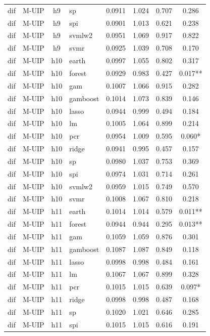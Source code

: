 \begin{ThreePartTable}
\begin{longtable}[t]{llclcccc}
dif & M-UIP & h9 & sp & 0.0911 & 1.024 & 0.707 & 0.286\\
dif & M-UIP & h9 & spi & 0.0901 & 1.013 & 0.621 & 0.238\\
dif & M-UIP & h9 & svmlw2 & 0.0951 & 1.069 & 0.917 & 0.822\\
dif & M-UIP & h9 & svmr & 0.0925 & 1.039 & 0.708 & 0.170\\
\addlinespace
dif & M-UIP & h10 & earth & 0.0997 & 1.055 & 0.802 & 0.317\\
dif & M-UIP & h10 & forest & 0.0929 & 0.983 & 0.427 & 0.017**\\
dif & M-UIP & h10 & gam & 0.1007 & 1.066 & 0.915 & 0.282\\
dif & M-UIP & h10 & gamboost & 0.1014 & 1.073 & 0.839 & 0.146\\
dif & M-UIP & h10 & lasso & 0.0944 & 0.999 & 0.494 & 0.184\\
dif & M-UIP & h10 & lm & 0.1005 & 1.064 & 0.899 & 0.214\\
dif & M-UIP & h10 & pcr & 0.0954 & 1.009 & 0.595 & 0.060*\\
dif & M-UIP & h10 & ridge & 0.0941 & 0.995 & 0.457 & 0.157\\
dif & M-UIP & h10 & sp & 0.0980 & 1.037 & 0.753 & 0.369\\
dif & M-UIP & h10 & spi & 0.0974 & 1.031 & 0.714 & 0.261\\
dif & M-UIP & h10 & svmlw2 & 0.0959 & 1.015 & 0.749 & 0.570\\
dif & M-UIP & h10 & svmr & 0.1008 & 1.067 & 0.810 & 0.218\\
\addlinespace
dif & M-UIP & h11 & earth & 0.1014 & 1.014 & 0.579 & 0.011**\\
dif & M-UIP & h11 & forest & 0.0944 & 0.944 & 0.295 & 0.013**\\
dif & M-UIP & h11 & gam & 0.1059 & 1.059 & 0.876 & 0.301\\
dif & M-UIP & h11 & gamboost & 0.1087 & 1.087 & 0.849 & 0.118\\
dif & M-UIP & h11 & lasso & 0.0998 & 0.998 & 0.484 & 0.161\\
dif & M-UIP & h11 & lm & 0.1067 & 1.067 & 0.899 & 0.328\\
dif & M-UIP & h11 & pcr & 0.1015 & 1.015 & 0.639 & 0.097*\\
dif & M-UIP & h11 & ridge & 0.0998 & 0.998 & 0.487 & 0.168\\
dif & M-UIP & h11 & sp & 0.1020 & 1.021 & 0.646 & 0.285\\
dif & M-UIP & h11 & spi & 0.1015 & 1.015 & 0.616 & 0.191\\

\end{longtable}
\end{ThreePartTable}
